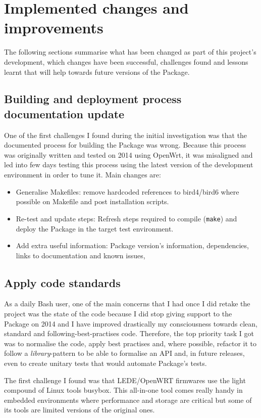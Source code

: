 \section{Implemented changes and improvements}
The following sections summarise what has been changed as part of this project's development, which changes have been successful, challenges found and lessons learnt that will help towards future versions of the Package.

\subsection{Building and deployment process documentation update}
One of the first challenges I found during the initial investigation was that the documented process for building the Package was wrong. Because this process was originally written and tested on 2014 using OpenWrt, it was misaligned and  led into few days testing this process using the latest version of the development environment in order to tune it. Main changes are:

\begin{itemize}
    \item Generalise Makefiles: remove hardcoded references to bird4/bird6 where possible on Makefile and post installation scripts.
    \item Re-test and update steps: Refresh steps required to compile (\texttt{make}) and deploy the Package in the target test environment.
    \item Add extra useful information: Package version's information, dependencies, links to documentation and known issues,  \end{itemize}

\subsection{Apply code standards}
As a daily Bash user, one of the main concerns that I had once I did retake the project was the state of the code because I did stop giving support to the Package on 2014 and I have improved drastically my consciousness towards clean, standard and following-best-practises code. Therefore, the top priority task I got was to normalise the code, apply best practises and, where possible, refactor it to follow a \textit{library}-pattern to be able to formalise an API and, in future releases, even to create unitary tests that would automate Package's tests.

The first challenge I found was that LEDE/OpenWRT firmwares use the light compound of Linux tools \Gls{busybox}. This all-in-one tool comes really handy in embedded environments where performance and storage are critical but some of its tools are limited versions of the original ones.

